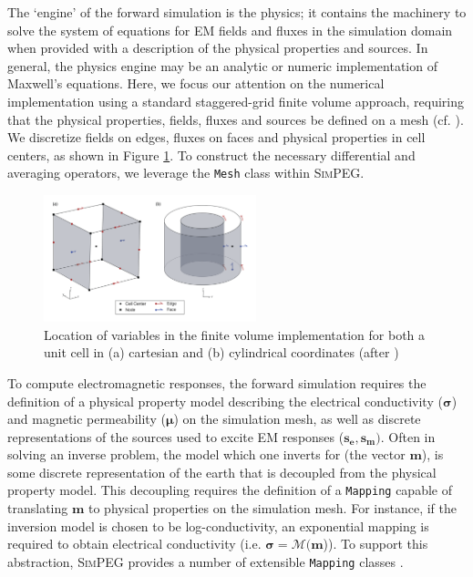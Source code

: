 \documentclass[preprint,review,3p,times,onecolumn,authoryear]{elsarticle}
\newcommand{\SimPEG}{\textsc{SimPEG}\xspace}
\newcommand{\Mesh}{\texttt{Mesh}\xspace}
\newcommand{\Mapping}{\texttt{Mapping}\xspace}
\begin{document}
The `engine' of the forward simulation is the physics; it contains the
machinery to solve the system of equations for EM fields and fluxes in the
simulation domain when provided with a description of the physical properties
and sources. In general, the physics engine may be an analytic or numeric
implementation of Maxwell's equations. Here, we focus our attention on the
numerical implementation using a standard staggered-grid finite volume
approach, requiring that the physical properties, fields, fluxes and sources
be defined on a mesh (cf. \cite{Haber2014a, Hyman2002, Hyman1999, Yee1966}).
We discretize fields on edges, fluxes on faces and physical properties in cell
centers, as shown in Figure \ref{fig:finiteVolumes}. To construct the
necessary differential and averaging operators, we leverage the \Mesh class
within \SimPEG \citep{Cockett2015, FV_Tutorial}.
\begin{figure}[htb!]
    \centering
    \includegraphics[width=0.55\textwidth]{images/finiteVolume-02}
    \caption{Location of variables in the finite volume implementation for both a unit cell in (a) cartesian and (b) cylindrical coordinates (after \cite{Heagy2015})}
\label{fig:finiteVolumes}
\end{figure}


To compute electromagnetic responses, the forward simulation requires the
definition of a physical property model describing the electrical conductivity
($\boldsymbol{\sigma}$) and magnetic permeability ($\boldsymbol{\mu}$) on the
simulation mesh, as well as discrete representations of the sources used to
excite EM responses ($\boldsymbol{s_e}, \boldsymbol{s_m})$. Often in solving
an inverse problem, the model which one inverts for (the vector $\mathbf{m}$),
is some discrete representation of the earth that is decoupled from the
physical property model. This decoupling requires the definition of a
\texttt{Mapping} capable of translating $\mathbf{m}$ to physical properties on
the simulation mesh. For instance, if the inversion model is chosen to be
log-conductivity, an exponential mapping is required to obtain electrical
conductivity (i.e. $\boldsymbol{\sigma} = \mathcal{M}(\mathbf{m}$)). To
support this abstraction, \SimPEG provides a number of extensible \Mapping
classes \citep{Cockett2015, Kang2015}.
\end{document}

